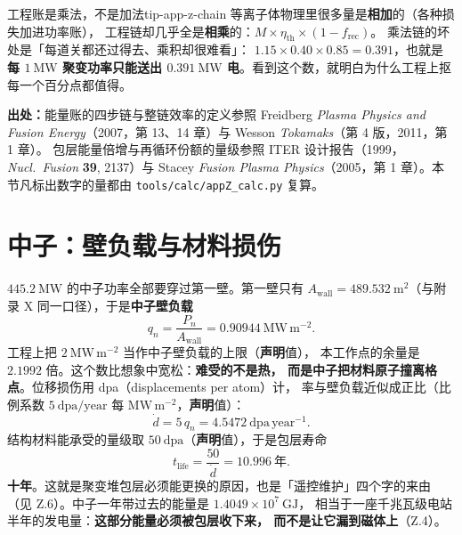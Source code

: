 \begin{tip}{工程账是乘法，不是加法}{tip-app-z-chain}
等离子体物理里很多量是\textbf{相加}的（各种损失加进功率账），
工程链却几乎全是\textbf{相乘}的：$M\times\eta_{\mathrm{th}}\times(1-f_{\mathrm{rec}})$。
乘法链的坏处是「每道关都还过得去、乘积却很难看」：
$1.15\times0.40\times0.85 = 0.391$，也就是\textbf{每 $1\ \mathrm{MW}$ 聚变功率只能送出
$0.391\ \mathrm{MW}$ 电}。看到这个数，就明白为什么工程上抠每一个百分点都值得。
\end{tip}

{\footnotesize
\textbf{出处：}能量账的四步链与整链效率的定义参照 Freidberg
\emph{Plasma Physics and Fusion Energy}（2007，第 13、14 章）与 Wesson
\emph{Tokamaks}（第 4 版，2011，第 1 章）。
包层能量倍增与再循环份额的量级参照
ITER 设计报告（1999，\emph{Nucl.\ Fusion} \textbf{39}, 2137）与 Stacey
\emph{Fusion Plasma Physics}（2005，第 1 章）。本节凡标出数字的量都由
\texttt{tools/\allowbreak{}calc/\allowbreak{}appZ\_calc.py} 复算。
}

\section{中子：壁负载与材料损伤}
\label{sec:app-z-neutron}

$445.2\ \mathrm{MW}$ 的中子功率全部要穿过第一壁。第一壁只有
$A_{\mathrm{wall}}=489.532\ \mathrm{m^2}$（与附录 X 同一口径），于是\textbf{中子壁负载}
\begin{equation}
q_n = \frac{P_n}{A_{\mathrm{wall}}} = 0.90944\ \mathrm{MW\,m^{-2}}.
\label{eq:app-z-qn}
\end{equation}
工程上把 $2\ \mathrm{MW\,m^{-2}}$ 当作中子壁负载的上限（\textbf{声明}值），
本工作点的余量是 $2.1992$ 倍。这个数比想象中宽松：\textbf{难受的不是热，
而是中子把材料原子撞离格点}。位移损伤用 dpa（displacements per atom）计，
率与壁负载近似成正比（比例系数 $5\ \mathrm{dpa/year}$ 每 $\mathrm{MW\,m^{-2}}$，\textbf{声明}值）：
\begin{equation}
\dot{d} = 5\,q_n = 4.5472\ \mathrm{dpa\,year^{-1}}.
\label{eq:app-z-dpa}
\end{equation}
结构材料能承受的量级取 $50\ \mathrm{dpa}$（\textbf{声明}值），于是包层寿命
\begin{equation}
t_{\mathrm{life}} = \frac{50}{\dot d} = 10.996\ \text{年}.
\label{eq:app-z-life}
\end{equation}
\textbf{十年}。这就是聚变堆包层必须能更换的原因，也是「遥控维护」四个字的来由
（见 Z.6）。中子一年带过去的能量是 $1.4049\times10^{7}\ \mathrm{GJ}$，
相当于一座千兆瓦级电站半年的发电量：\textbf{这部分能量必须被包层收下来，
而不是让它漏到磁体上}（Z.4）。

